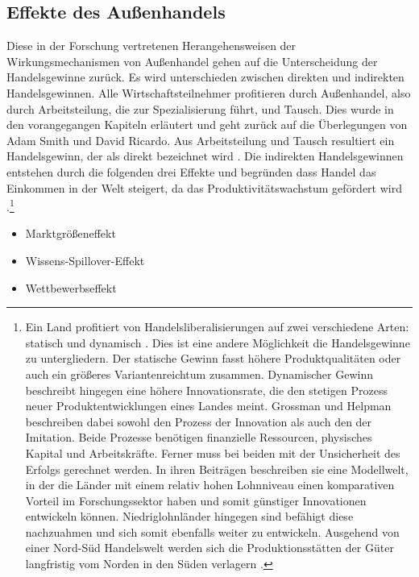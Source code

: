 \subsection{Effekte des Au{\ss}enhandels}\label{Effekte Handel}
Diese in der Forschung vertretenen Herangehensweisen der Wirkungsmechanismen von Au{\ss}enhandel gehen auf die Unterscheidung der Handelsgewinne zurück. Es wird unterschieden zwischen direkten und indirekten Handelsgewinnen. Alle Wirtschaftsteilnehmer profitieren durch Au{\ss}enhandel, also durch Arbeitsteilung, die zur Spezialisierung f{\"u}hrt, und Tausch. Dies wurde in den vorangegangen Kapiteln erl{\"a}utert und geht zur{\"u}ck auf die {\"U}berlegungen von Adam Smith und David Ricardo. Aus Arbeitsteilung und Tausch resultiert ein Handelsgewinn, der als direkt bezeichnet wird \citep{Mill.1909}. Die indirekten Handelsgewinnen entstehen durch die folgenden drei Effekte und begr{\"u}nden dass Handel das Einkommen in der Welt steigert, da das Produktivit{\"a}tswachstum gef{\"o}rdert wird \citep{Aghion.1998}.\footnote{Ein Land profitiert von Handelsliberalisierungen auf zwei verschiedene Arten: statisch und dynamisch \citep{Grossman.1989a,Grossman.1991b,Grossman.1991c,RiveraBatiz.,RiveraBatiz.1991a}. Dies ist eine andere M{\"o}glichkeit die Handelsgewinne zu untergliedern. Der statische Gewinn fasst h{\"o}here Produktqualit{\"a}ten oder auch ein gr{\"o}{\ss}eres Variantenreichtum zusammen. Dynamischer Gewinn beschreibt hingegen eine h{\"o}here Innovationsrate, die den stetigen Prozess neuer Produktentwicklungen eines Landes meint. Grossman und Helpman beschreiben dabei sowohl den Prozess der Innovation als auch den der Imitation. Beide Prozesse ben{\"o}tigen finanzielle Ressourcen, physisches Kapital und Arbeitskr{\"a}fte. Ferner muss bei beiden mit der Unsicherheit des Erfolgs gerechnet werden. In ihren Beitr{\"a}gen beschreiben sie eine Modellwelt, in der die L{\"a}nder mit einem relativ hohen Lohnniveau einen komparativen Vorteil im Forschungssektor haben und somit g{\"u}nstiger Innovationen entwickeln k{\"o}nnen. Niedriglohnl{\"a}nder hingegen sind bef{\"a}higt diese nachzuahmen und sich somit ebenfalls weiter zu entwickeln. Ausgehend von einer Nord-S{\"u}d Handelswelt werden sich die Produktionsst{\"a}tten der G{\"u}ter langfristig vom Norden in den S{\"u}den verlagern \citep{Grossman.1991c}.}

	\begin{itemize}
		\item [1.] Marktgr{\"o}{\ss}eneffekt
		\item [2.] Wissens-Spillover-Effekt
		\item [3.] Wettbewerbseffekt
	\end{itemize}

